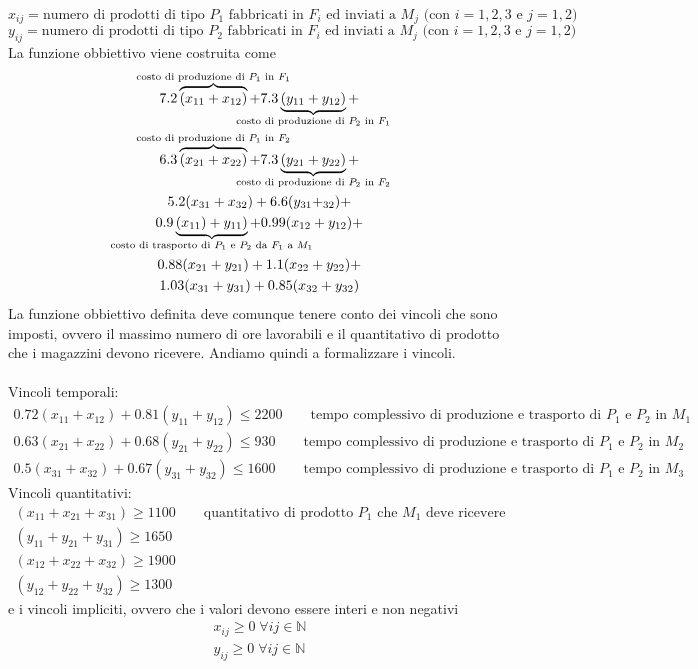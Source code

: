 \documentclass[italian]{article}
\begin{document}
\[
	x_{ij} = \text{numero di prodotti di tipo $P_1$ fabbricati in $F_i$ ed inviati a $M_j$ (con $i=1,2,3$ e $j=1,2$) }
\]
\[
	y_{ij} = \text{numero di prodotti di tipo $P_2$ fabbricati in $F_i$ ed inviati a $M_j$ (con $i=1,2,3$ e $j=1,2$) }
\]
La funzione obbiettivo viene costruita come
\begin{gather*}
	7.2\overbrace{(x_{11} + x_{12})}^{\mathclap{\text{costo di produzione di $P_1$ in $F_1$}}} + 7.3\underbrace{(y_{11} + y_{12})}_{\mathclap{\text{costo di produzione di $P_2$ in $F_1$}}} + \\
	6.3\overbrace{(x_{21} + x_{22})}^{\mathclap{\text{costo di produzione di $P_1$ in $F_2$}}} + 7.3\underbrace{(y_{21} + y_{22})}_{\mathclap{\text{costo di produzione di $P_2$ in $F_2$}}} + \\
	5.2(x_{31} + x_{32}) + 6.6(y_{31} + _{32}) + \\
	0.9\underbrace{(x_{11}) + y_{11})}_{\mathclap{\text{costo di trasporto di $P_1$ e $P_2$ da $F_1$ a $M_1$}}} + 0.99(x_{12} + y_{12}) + \\
	0.88(x_{21} + y_{21}) + 1.1(x_{22} + y_{22}) + \\
	1.03(x_{31} + y_{31}) + 0.85(x_{32} + y_{32})
\end{gather*}
La funzione obbiettivo definita deve comunque tenere conto dei vincoli che sono imposti, ovvero il massimo numero di ore lavorabili e il quantitativo di prodotto che i magazzini devono ricevere. Andiamo quindi a formalizzare i vincoli.\\\\
Vincoli temporali:
\begin{gather*}
	0.72(x_{11} + x_{12}) + 0.81(y_{11} + y_{12}) \leq 2200 \qquad \text{tempo complessivo di produzione e trasporto di $P_1$ e $P_2$ in $M_1$} \\
	0.63(x_{21} + x_{22}) + 0.68(y_{21} + y_{22}) \leq 930 \qquad \text{tempo complessivo di produzione e trasporto di $P_1$ e $P_2$ in $M_2$} \\
	0.5(x_{31} + x_{32}) + 0.67(y_{31} + y_{32}) \leq 1600 \qquad \text{tempo complessivo di produzione e trasporto di $P_1$ e $P_2$ in $M_3$} 
\end{gather*}
Vincoli quantitativi:
\begin{gather*}
	(x_{11} + x_{21} + x_{31}) \geq 1100 \qquad \text{quantitativo di prodotto $P_1$ che $M_1$ deve ricevere}\\
	(y_{11} + y_{21} + y_{31}) \geq 1650 \\
	(x_{12} + x_{22} + x_{32}) \geq 1900\\
	(y_{12} + y_{22} + y_{32}) \geq 1300
\end{gather*}
e i vincoli impliciti, ovvero che i valori devono essere interi e non negativi
\begin{gather*}
	x_{ij} \geq 0 \; \forall ij \in \mathbb{N} \\
	y_{ij} \geq 0 \; \forall ij \in \mathbb{N} 
\end{gather*}
\end{document}
